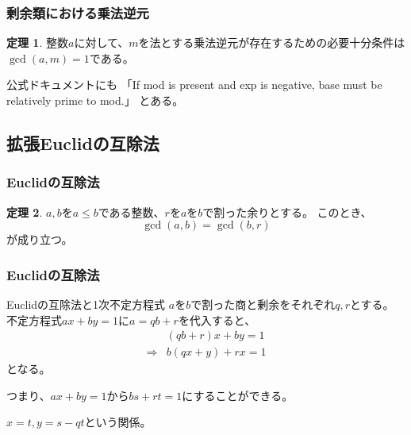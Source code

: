 \documentclass[aspectratio=169,dvipdfmx,14pt,notheorems]{beamer}
\theoremstyle{definition}
\newtheorem{theorem}{定理}
\begin{document}
\begin{frame}[fragile]\frametitle{剰余類における乗法逆元}
\begin{theorem}
整数$a$に対して、$m$を法とする乗法逆元が存在するための必要十分条件は$\gcd(a, m)=1$である。
\end{theorem}
公式ドキュメントにも
「If mod is present and exp is negative, base must be relatively prime to mod.」
とある。
\end{frame}

\subsection{拡張Euclidの互除法}

\begin{frame}[fragile]\frametitle{Euclidの互除法}
\begin{theorem}
$a, b$を$a \leq b$である整数、$r$を$a$を$b$で割った余りとする。
このとき、
\begin{equation*}
\gcd(a, b) = \gcd(b, r)
\end{equation*}
が成り立つ。
\end{theorem}
\end{frame}

\begin{frame}[fragile]\frametitle{Euclidの互除法}
\begin{block}{Euclidの互除法と1次不定方程式}
$a$を$b$で割った商と剰余をそれぞれ$q, r$とする。
不定方程式$ax+by=1$に$a = qb + r$を代入すると、
\begin{align*}
& (qb + r)x + by = 1 \\
\Rightarrow & b(qx + y) + rx = 1
\end{align*}
となる。
\end{block}
つまり、$ax+by=1$から$bs + rt = 1$にすることができる。

$x=t, y = s - qt$という関係。
\end{frame}
\end{document}
